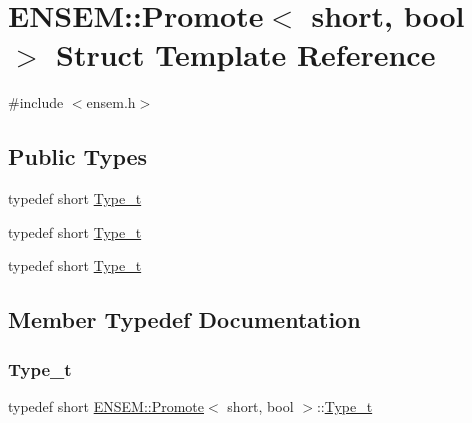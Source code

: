 \hypertarget{structENSEM_1_1Promote_3_01short_00_01bool_01_4}{}\section{E\+N\+S\+EM\+:\+:Promote$<$ short, bool $>$ Struct Template Reference}
\label{structENSEM_1_1Promote_3_01short_00_01bool_01_4}


{\ttfamily \#include $<$ensem.\+h$>$}

\subsection*{Public Types}
\begin{DoxyCompactItemize}
\item 
typedef short \mbox{\hyperlink{structENSEM_1_1Promote_3_01short_00_01bool_01_4_a4f58ddab80108afc16273b6a677fcdaf}{Type\+\_\+t}}
\item 
typedef short \mbox{\hyperlink{structENSEM_1_1Promote_3_01short_00_01bool_01_4_a4f58ddab80108afc16273b6a677fcdaf}{Type\+\_\+t}}
\item 
typedef short \mbox{\hyperlink{structENSEM_1_1Promote_3_01short_00_01bool_01_4_a4f58ddab80108afc16273b6a677fcdaf}{Type\+\_\+t}}
\end{DoxyCompactItemize}


\subsection{Member Typedef Documentation}
\mbox{\label{structENSEM_1_1Promote_3_01short_00_01bool_01_4_a4f58ddab80108afc16273b6a677fcdaf}} 
\subsubsection{\texorpdfstring{Type\_t}{Type\_t}\hspace{0.1cm}{\footnotesize\ttfamily [1/3]}}
{\footnotesize\ttfamily typedef short \mbox{\hyperlink{structENSEM_1_1Promote}{E\+N\+S\+E\+M\+::\+Promote}}$<$ short, bool $>$\+::\mbox{\hyperlink{structENSEM_1_1Promote_3_01short_00_01bool_01_4_a4f58ddab80108afc16273b6a677fcdaf}{Type\+\_\+t}}}

